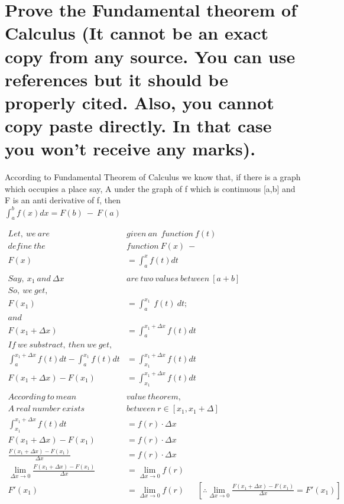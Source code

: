 \documentclass[12pt]{article}%
\begin{document}
\pagebreak

\section{Prove the Fundamental theorem of Calculus (It cannot be an exact copy from
any source. You can use references but it should be properly cited. Also, you
cannot copy paste directly. In that case you won’t receive any marks).}

\begin{parag}
    According to Fundamental Theorem of Calculus we know that, if there is a graph which occupies a place say, A under the graph of f which is continuous  [a,b] and F is an anti derivative of f, then\\
    \centering $\int _{a}^{b} f(x) dx = F(b) \: - \: F(a)$\\
\end{parag}

\begin{align*}
    Let, \ we \ are \ &given \ an \ \ function \ f(t) \\
    define \ the \ &function \ F(x) \ - \\
    F(x) &= \int_{a}^{x} f(t) dt\\
    \\
    Say, \ x_1 \ and \ \Delta x \ &are \ two \ values\ between \ [a+b] \\
    So, \ we \ get, \\
    F(x_1) &= \int_{a}^{x_1} \ f(t) \ dt;\\
    and\\
    F(x_1 + \Delta x) &= \int_{a}^{x_1 + \Delta x} f(t) dt\\
    If \ we \ substract, \ then \ we \ get, &\\
    \int_{a}^{x_1+ \Delta x} f(t)dt - \int_{a}^{x_1} f(t) dt &=  \int_{x_1}^{x_1+ \Delta x} f(t)dt\\
    F(x_1 + \Delta x) - F(x_1) &= \int_{x_1}^{x_1+ \Delta x} f(t)dt\\\\
    According \ to \ mean \ & value \ theorem,\\
    A \ real \ number \ exists \ &between \ r \in [x_1, x_1+\Delta] \\ 
    \int_{x_1}^{x_1+ \Delta x} f(t)dt &= f(r) \cdot \Delta x\\
    F(x_1 + \Delta x)- F(x_1) &= f(r) \cdot \Delta x\\
    \frac{F(x_1 + \Delta x)- F(x_1)}{\Delta x} &= f(r) \cdot \Delta x\\
    \lim_{\Delta x \to 0} \frac{F(x_1 + \Delta x)- F(x_1)}{\Delta x} &= \lim_{\Delta x \to 0} f(r) \\
    {F}'(x_1) &= \lim_{\Delta x \to 0} f(r) \ \ \ \ \ \ \ \left[\therefore \lim_{\Delta x \to 0} \frac{F(x_1 + \Delta x)- F(x_1)}{\Delta x}={F}'(x_1) \right]\\
\end{align*}
\end{document}
